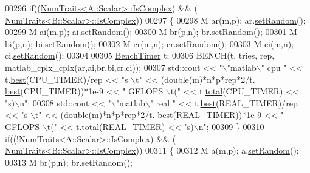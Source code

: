 \begin{DoxyCode}
{00296   \textcolor{keywordflow}{if}((\hyperlink{group___core___module_struct_eigen_1_1_num_traits}{NumTraits<A::Scalar>::IsComplex}) && (
      \hyperlink{group___core___module_struct_eigen_1_1_num_traits}{NumTraits<B::Scalar>::IsComplex}))
00297   \{
00298     M ar(m,p); ar.\hyperlink{class_eigen_1_1_plain_object_base_af0e576a0e1aefc9ee346de44cc352ba3}{setRandom}();
00299     M ai(m,p); ai.\hyperlink{class_eigen_1_1_plain_object_base_af0e576a0e1aefc9ee346de44cc352ba3}{setRandom}();
00300     M br(p,n); br.setRandom();
00301     M bi(p,n); bi.\hyperlink{class_eigen_1_1_plain_object_base_af0e576a0e1aefc9ee346de44cc352ba3}{setRandom}();
00302     M cr(m,n); cr.\hyperlink{class_eigen_1_1_plain_object_base_af0e576a0e1aefc9ee346de44cc352ba3}{setRandom}();
00303     M ci(m,n); ci.\hyperlink{class_eigen_1_1_plain_object_base_af0e576a0e1aefc9ee346de44cc352ba3}{setRandom}();
00304     
00305     \hyperlink{class_eigen_1_1_bench_timer}{BenchTimer} t;
00306     BENCH(t, tries, rep, matlab\_cplx\_cplx(ar,ai,br,bi,cr,ci));
00307     std::cout << \textcolor{stringliteral}{"\(\backslash\)"matlab\(\backslash\)" cpu    "} << t.\hyperlink{class_eigen_1_1_bench_timer_ae8b673b0fa356d3432c7a65c79e8af0e}{best}(CPU\_TIMER)/rep  << \textcolor{stringliteral}{"s  \(\backslash\)t"} << (double(m)*n*p*rep*2/t.
      \hyperlink{class_eigen_1_1_bench_timer_ae8b673b0fa356d3432c7a65c79e8af0e}{best}(CPU\_TIMER))*1e-9  <<  \textcolor{stringliteral}{" GFLOPS \(\backslash\)t("} << t.\hyperlink{class_eigen_1_1_bench_timer_af341aa613dba2d4a3d167093197e4e7a}{total}(CPU\_TIMER)  << \textcolor{stringliteral}{"s)\(\backslash\)n"};
00308     std::cout << \textcolor{stringliteral}{"\(\backslash\)"matlab\(\backslash\)" real   "} << t.\hyperlink{class_eigen_1_1_bench_timer_ae8b673b0fa356d3432c7a65c79e8af0e}{best}(REAL\_TIMER)/rep << \textcolor{stringliteral}{"s  \(\backslash\)t"} << (double(m)*n*p*rep*2/t.
      \hyperlink{class_eigen_1_1_bench_timer_ae8b673b0fa356d3432c7a65c79e8af0e}{best}(REAL\_TIMER))*1e-9 <<  \textcolor{stringliteral}{" GFLOPS \(\backslash\)t("} << t.\hyperlink{class_eigen_1_1_bench_timer_af341aa613dba2d4a3d167093197e4e7a}{total}(REAL\_TIMER) << \textcolor{stringliteral}{"s)\(\backslash\)n"};
00309   \}
00310   \textcolor{keywordflow}{if}((!\hyperlink{group___core___module_struct_eigen_1_1_num_traits}{NumTraits<A::Scalar>::IsComplex}) && (
      \hyperlink{group___core___module_struct_eigen_1_1_num_traits}{NumTraits<B::Scalar>::IsComplex}))
00311   \{
00312     M a(m,p);  a.\hyperlink{class_eigen_1_1_plain_object_base_af0e576a0e1aefc9ee346de44cc352ba3}{setRandom}();
00313     M br(p,n); br.setRandom();
}
\end{DoxyCode}
